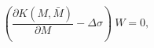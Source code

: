 \begin{equation}
\left(\frac{\partial K(M,\bar M)}{\partial M}- \Delta \sigma \right)~W 
=0,
\label{sol-M}
\end{equation}

